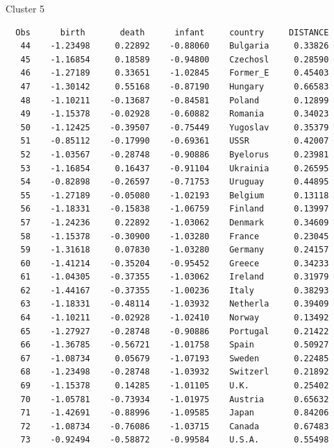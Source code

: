 \documentclass[pdf]{prosper}
\begin{document}
\begin{slide}{Cluster 5}

{\tiny
\begin{verbatim}
  Obs      birth       death      infant     country     DISTANCE
   44    -1.23498     0.22892    -0.88060    Bulgaria     0.33826
   45    -1.16854     0.18589    -0.94800    Czechosl     0.28590
   46    -1.27189     0.33651    -1.02845    Former_E     0.45403
   47    -1.30142     0.55168    -0.87190    Hungary      0.66583
   48    -1.10211    -0.13687    -0.84581    Poland       0.12899
   49    -1.15378    -0.02928    -0.60882    Romania      0.34023
   50    -1.12425    -0.39507    -0.75449    Yugoslav     0.35379
   51    -0.85112    -0.17990    -0.69361    USSR         0.42007
   52    -1.03567    -0.28748    -0.90886    Byelorus     0.23981
   53    -1.16854     0.16437    -0.91104    Ukrainia     0.26595
   54    -0.82898    -0.26597    -0.71753    Uruguay      0.44895
   55    -1.27189    -0.05080    -1.02193    Belgium      0.13118
   56    -1.18331    -0.15838    -1.06759    Finland      0.13997
   57    -1.24236     0.22892    -1.03062    Denmark      0.34609
   58    -1.15378    -0.30900    -1.03280    France       0.23045
   59    -1.31618     0.07830    -1.03280    Germany      0.24157
   60    -1.41214    -0.35204    -0.95452    Greece       0.34233
   61    -1.04305    -0.37355    -1.03062    Ireland      0.31979
   62    -1.44167    -0.37355    -1.00236    Italy        0.38293
   63    -1.18331    -0.48114    -1.03932    Netherla     0.39409
   64    -1.10211    -0.02928    -1.02410    Norway       0.13492
   65    -1.27927    -0.28748    -0.90886    Portugal     0.21422
   66    -1.36785    -0.56721    -1.01758    Spain        0.50927
   67    -1.08734     0.05679    -1.07193    Sweden       0.22485
   68    -1.23498    -0.28748    -1.03932    Switzerl     0.21892
   69    -1.15378     0.14285    -1.01105    U.K.         0.25402
   70    -1.05781    -0.73934    -1.01975    Austria      0.65632
   71    -1.42691    -0.88996    -1.09585    Japan        0.84206
   72    -1.08734    -0.76086    -1.03715    Canada       0.67483
   73    -0.92494    -0.58872    -0.99584    U.S.A.       0.55498

\end{verbatim}
}
  
\end{slide}
\end{document}
